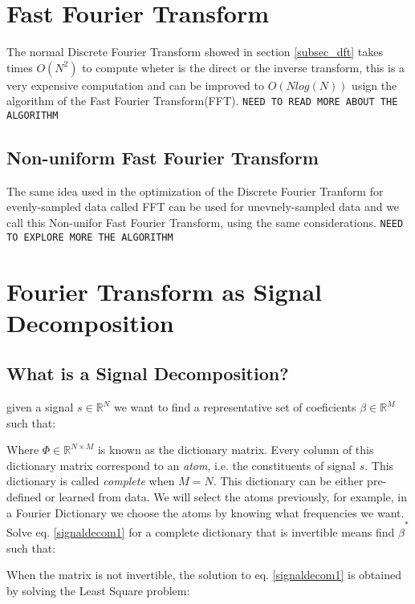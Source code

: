 \section{Fast Fourier Transform}
\newp The normal Discrete Fourier Transform showed in section \ref{subsec_dft} takes times $O(N^2)$ to compute wheter is the direct or the inverse transform, this is a very expensive computation and can be improved to $O(N log(N))$ usign the algorithm of the Fast Fourier Transform(FFT). \texttt{NEED TO READ MORE ABOUT THE ALGORITHM}
\subsection{Non-uniform Fast Fourier Transform}
\newp The same idea used in the optimization of the Discrete Fourier Tranform for evenly-sampled data called FFT can be used for unevnely-sampled data and we call this Non-unifor Fast Fourier Transform, using the same considerations. \texttt{NEED TO EXPLORE MORE THE ALGORITHM}
\section{Fourier Transform as Signal Decomposition}
\subsection{What is a Signal Decomposition?}
\newp given a signal $s \in \mathbb{R}^{N}$ we want to find a representative set of coeficients $\beta \in\mathbb{R}^{M}$ such that:


\newp Where $\Phi \in \mathbb{R}^{N \times M}$ is known as the dictionary matrix. Every column of this dictionary matrix correspond to an \textit{atom}, i.e. the constituents of signal $s$. This dictionary is called \textit{complete} when $M = N$. This dictionary can be either pre-defined or learned from data. We will select the atoms previously, for example, in a Fourier Dictionary we choose the atoms by knowing what frequencies we want.
\newp Solve eq. \ref{signaldecom1} for a complete dictionary that is invertible means find $\hat{\beta}^{*}$ such that:


\newp When the matrix is not invertible, the solution to eq. \ref{signaldecom1} is obtained by solving the  Least Square problem:

